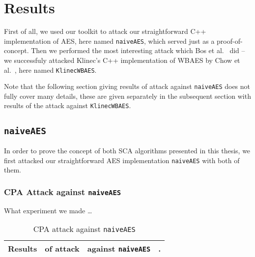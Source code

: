 \section{Results}
\label{sec:results}

First of all, we used our toolkit to attack our straightforward C++ implementation of AES, here named {\tt naiveAES}, which served just as a proof-of-concept. Then we performed the most interesting attack which Bos et al.\ \cite{bos2015differential} did -- we successfuly attacked Klinec's C++ implementation \cite{klinec2013implementation} of WBAES by Chow et al.\ \cite{chow2003aes}, here named {\tt KlinecWBAES}.

Note that the following section giving results of attack against {\tt naiveAES} does not fully cover many details, these are given separately in the subsequent section with results of the attack against {\tt KlinecWBAES}.



\subsection{\tt naiveAES}
\label{sec:naiveaes}

In order to prove the concept of both SCA algorithms presented in this thesis, we first attacked our straightforward AES implementation {\tt naiveAES} with both of them.

\subsubsection{CPA Attack against {\tt naiveAES}}
	
	What experiment we made \ldots
	
	\begin{table}[H]
		\begin{center}
		\begin{tabular}{| c | c | c | c |}
			\hline
			Results & of attack & against {\tt naiveAES} & . \\
			\hline
		\end{tabular}
		\end{center}
	\caption{CPA attack against {\tt naiveAES}}
	\label{tab:naiveaescpa}
	\end{table}
	

